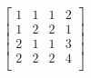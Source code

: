 \documentclass[preview, border=0pt]{standalone}
\begin{document}
\begin{figure}
\[
\begin{bmatrix}
    1 & 1 & 1 & 2 \\
    1 & 2 & 2 & 1 \\
    2 & 1 & 1 & 3 \\
    2 & 2 & 2 & 4 \\
\end{bmatrix}
\]
\end{figure}
\end{document}
